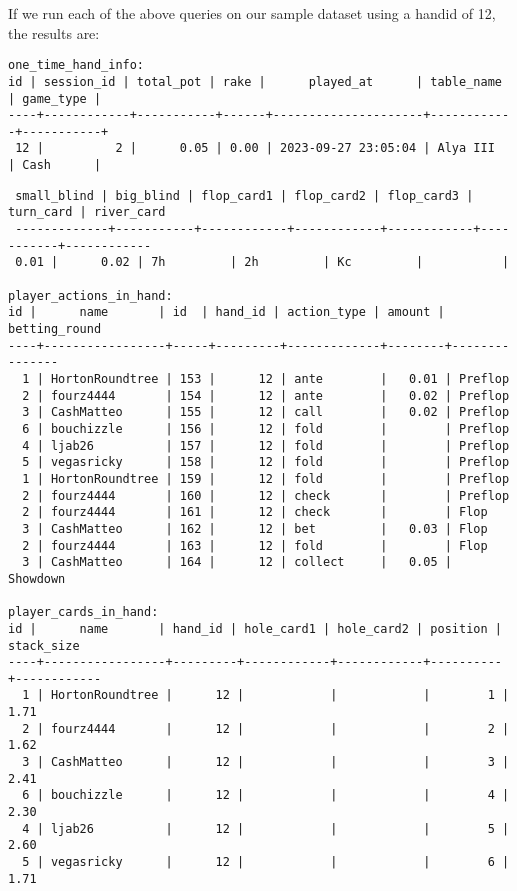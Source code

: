 \documentclass{article}
\begin{document}
        If we run each of the above queries on our sample dataset using a hand\textunderscore id of 12, the results are:
        \begin{verbatim}
one_time_hand_info: 
id | session_id | total_pot | rake |      played_at      | table_name | game_type | 
----+------------+-----------+------+---------------------+------------+-----------+
 12 |          2 |      0.05 | 0.00 | 2023-09-27 23:05:04 | Alya III   | Cash      |
        \end{verbatim}
        \newpage
        \begin{verbatim}
 small_blind | big_blind | flop_card1 | flop_card2 | flop_card3 | turn_card | river_card 
 -------------+-----------+------------+------------+------------+-----------+------------
 0.01 |      0.02 | 7h         | 2h         | Kc         |           | 

player_actions_in_hand: 
id |      name       | id  | hand_id | action_type | amount | betting_round 
----+-----------------+-----+---------+-------------+--------+---------------
  1 | HortonRoundtree | 153 |      12 | ante        |   0.01 | Preflop
  2 | fourz4444       | 154 |      12 | ante        |   0.02 | Preflop
  3 | CashMatteo      | 155 |      12 | call        |   0.02 | Preflop
  6 | bouchizzle      | 156 |      12 | fold        |        | Preflop
  4 | ljab26          | 157 |      12 | fold        |        | Preflop
  5 | vegasricky      | 158 |      12 | fold        |        | Preflop
  1 | HortonRoundtree | 159 |      12 | fold        |        | Preflop
  2 | fourz4444       | 160 |      12 | check       |        | Preflop
  2 | fourz4444       | 161 |      12 | check       |        | Flop
  3 | CashMatteo      | 162 |      12 | bet         |   0.03 | Flop
  2 | fourz4444       | 163 |      12 | fold        |        | Flop
  3 | CashMatteo      | 164 |      12 | collect     |   0.05 | Showdown

player_cards_in_hand: 
id |      name       | hand_id | hole_card1 | hole_card2 | position | stack_size 
----+-----------------+---------+------------+------------+----------+------------
  1 | HortonRoundtree |      12 |            |            |        1 |       1.71
  2 | fourz4444       |      12 |            |            |        2 |       1.62
  3 | CashMatteo      |      12 |            |            |        3 |       2.41
  6 | bouchizzle      |      12 |            |            |        4 |       2.30
  4 | ljab26          |      12 |            |            |        5 |       2.60
  5 | vegasricky      |      12 |            |            |        6 |       1.71

        \end{verbatim}
\end{document}
